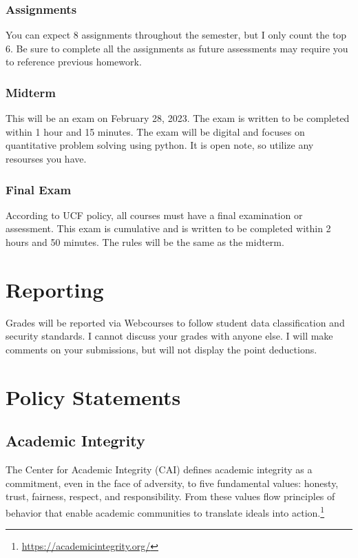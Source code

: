 \documentclass[11pt]{paper}
\begin{document}
\subsubsection{Assignments}
You can expect 8 assignments throughout the semester, but I only count the top 6. Be sure to complete all the assignments as future assessments may require you to reference previous homework.

\subsubsection{Midterm}
This will be an exam on February 28, 2023. The exam is written to be completed within 1 hour and 15 minutes. The exam will be digital and focuses on quantitative problem solving using python. It is open note, so utilize any resourses you have.

\subsubsection{Final Exam}
According to UCF policy, all courses must have a final examination or assessment. This exam is cumulative and is written to be completed within 2 hours and 50 minutes. The rules will be the same as the midterm.

\section{Reporting}
Grades will be reported via Webcourses to follow student data classification and security standards. I cannot discuss your grades with anyone else. I will make comments on your submissions, but will not display the point deductions.

\section{Policy Statements}
\subsection{Academic Integrity} \label{sec:ai}
The Center for Academic Integrity (CAI) defines academic integrity as a commitment, even in the face of adversity, to five fundamental values: honesty, trust, fairness, respect, and responsibility. From these values flow principles of behavior that enable academic communities to translate ideals into action.\footnote{\url{https://academicintegrity.org/}}\\
\end{document}

